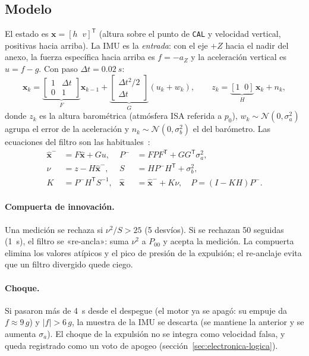 \subsection{Modelo}
El estado es $\mathbf{x}=[h\;\;v]^{\mathsf T}$ (altura sobre el punto de \texttt{CAL} y
velocidad vertical, positivas hacia arriba). La IMU es la \emph{entrada}: con el eje $+Z$
hacia el nadir del anexo, la fuerza específica hacia arriba es $f=-a_Z$ y la aceleración
vertical es $u=f-g$. Con paso $\Delta t=\SI{0.02}{s}$:
\begin{equation}
  \mathbf{x}_k = \underbrace{\begin{bmatrix}1&\Delta t\\0&1\end{bmatrix}}_{F}\mathbf{x}_{k-1}
  + \underbrace{\begin{bmatrix}\Delta t^2/2\\ \Delta t\end{bmatrix}}_{G}(u_k + w_k),
  \qquad z_k = \underbrace{[1\;\;0]}_{H}\,\mathbf{x}_k + n_k,
  \label{eq:electronica-modelo}
\end{equation}
donde $z_k$ es la altura barométrica (atmósfera ISA referida a $p_0$),
$w_k\sim\mathcal N(0,\sigma_a^2)$ agrupa el error de la aceleración y
$n_k\sim\mathcal N(0,\sigma_b^2)$ el del barómetro. Las ecuaciones del filtro son las
habituales~\cite{electronica-simon2006}:
\begin{equation}
\begin{aligned}
  \hat{\mathbf x}^- &= F\hat{\mathbf x} + G u, & P^- &= FPF^{\mathsf T} + GG^{\mathsf T}\sigma_a^2,\\
  \nu &= z - H\hat{\mathbf x}^-, & S &= HP^-H^{\mathsf T} + \sigma_b^2,\\
  K &= P^-H^{\mathsf T}S^{-1}, & \hat{\mathbf x} &= \hat{\mathbf x}^- + K\nu,\quad P=(I-KH)P^-.
\end{aligned}
\label{eq:electronica-kf}
\end{equation}

\paragraph{Compuerta de innovación.} Una medición se rechaza si $\nu^2/S>25$ (5 desvíos).
Si se rechazan 50 seguidas (\SI{1}{s}), el filtro se «re-ancla»: suma $\nu^2$ a $P_{00}$ y
acepta la medición. La compuerta elimina los valores atípicos y el pico de presión de la
expulsión; el re-anclaje evita que un filtro divergido quede ciego.

\paragraph{Choque.} Si pasaron más de \SI{4}{s} desde el despegue (el motor ya se apagó:
su empuje da $f\approx9\,g$) y $|f|>6\,g$, la muestra de la IMU se descarta
(se mantiene la anterior y se aumenta $\sigma_a$). El choque de la expulsión no se integra
como velocidad falsa, y queda registrado como un voto de apogeo
(sección~\ref{sec:electronica-logica}).


